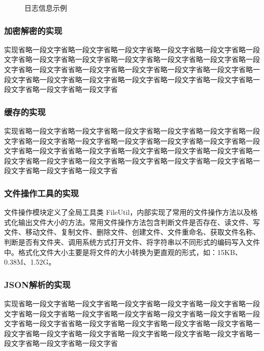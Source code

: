     \begin{figure}[H]
    	\centering
    	\caption{日志信息示例}
    	\label{img_log_sample}
    \end{figure}
    
    
   	\subsubsection{加密解密的实现}
    
    实现省略一段文字省略一段文字省略一段文字省略一段文字省略一段文字省略一段文字省略一段文字省略一段文字省略一段文字省略一段文字省略一段文字省略一段文字省略一段文字省省略一段文字省略一段文字省略一段文字省略一段文字省略一段文字省略一段文字省略一段文字省略一段文字省略一段文字省略一段文字省略一段文字省略一段文字省略一段文字省
        
   	\subsubsection{缓存的实现}
   	
   	实现省略一段文字省略一段文字省略一段文字省略一段文字省略一段文字省略一段文字省略一段文字省略一段文字省略一段文字省略一段文字省略一段文字省略一段文字省略一段文字省省略一段文字省略一段文字省略一段文字省略一段文字省略一段文字省略一段文字省略一段文字省略一段文字省略一段文字省略一段文字省略一段文字省略一段文字省略一段文字省
   	   	
   	\subsubsection{文件操作工具的实现}
   	
   	文件操作模块定义了全局工具类 FileUtil，内部实现了常用的文件操作方法以及格式化输出文件大小的方法。常用文件操作方法包含判断文件是否存在、读文件、写文件、移动文件、复制文件、删除文件、创建文件、文件重命名、获取文件名称、判断是否有文件夹、调用系统方式打开文件、将字符串以不同形式的编码写入文件中。格式化文件大小主要是将文件的大小转换为更直观的形式，如：15KB、0.38M、1.52G。
   	
   	\subsubsection{JSON解析的实现}

	实现省略一段文字省略一段文字省略一段文字省略一段文字省略一段文字省略一段文字省略一段文字省略一段文字省略一段文字省略一段文字省略一段文字省略一段文字省略一段文字省省略一段文字省略一段文字省略一段文字省略一段文字省略一段文字省略一段文字省略一段文字省略一段文字省略一段文字省略一段文字省略一段文字省略一段文字省略一段文字省
	
